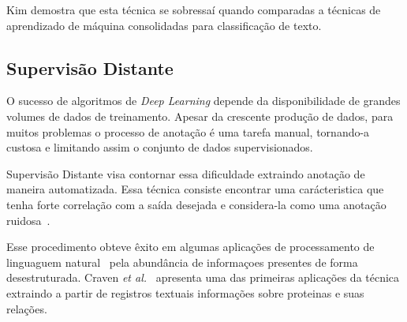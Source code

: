 Kim demostra que esta técnica se sobressaí quando comparadas a técnicas de aprendizado de máquina consolidadas para
classificação de texto.

\subsection{Supervisão Distante}\label{distant_supervision}

O sucesso de algoritmos de \textit{Deep Learning} depende da disponibilidade de grandes volumes de dados de treinamento.
Apesar da crescente produção de dados, para muitos problemas o processo de anotação é uma tarefa manual, tornando-a
custosa e limitando assim o conjunto de dados supervisionados.

Supervisão Distante visa contornar essa dificuldade extraindo anotação de maneira automatizada.
Essa técnica consiste encontrar uma carácteristica que tenha forte correlação com a saída desejada e considera-la como
uma anotação ruidosa~\cite{go09}.

Esse procedimento obteve êxito em algumas aplicações de processamento de linguaguem natural~\cite{craven99}\cite{go09}
pela abundância de informaçoes presentes de forma desestruturada.
Craven \textit{et al.}~\cite{craven99} apresenta uma das primeiras aplicações da técnica extraindo a partir de registros
textuais informações sobre proteinas e suas relações.

